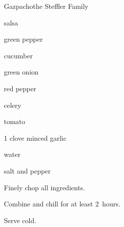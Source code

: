 \begin{recipe}{Gazpacho}{the Steffler Family}{}

\begin{ingredients}
\item {} salsa
\item {} green pepper
\item {} cucumber
\item \C{\quarter} green onion
\item \C{} red pepper
\item {} celery
\item {} tomato
\item 1 clove minced garlic
\item {} water
\item salt and pepper
\end{ingredients}

\begin{directions}
\item Finely chop all ingredients.
\item Combine and chill for at least 2~hours.
\item Serve cold.
\end{directions}
\end{recipe}
